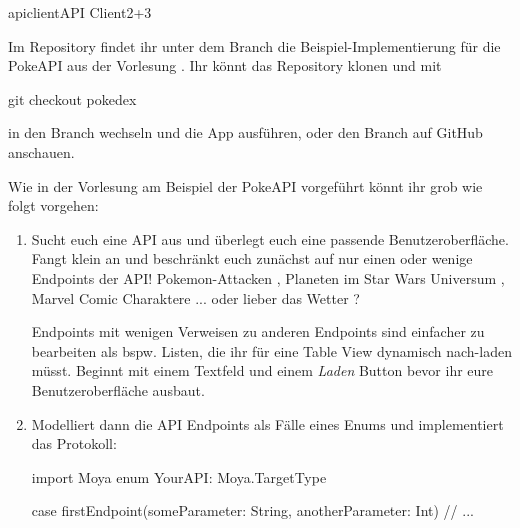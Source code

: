 \documentclass[parskip=half, final]{scrreprt}
\begin{document}
\begin{lecture}
\begin{exc}
\begin{excitem}{apiclient}{API Client}{2+3}

Im Repository findet ihr unter dem Branch  die Beispiel-Implementierung für die PokeAPI aus der Vorlesung . Ihr könnt das Repository klonen und mit
\begin{shcode}
git checkout pokedex
\end{shcode}
in den Branch wechseln und die App ausführen, oder den Branch auf GitHub  anschauen.


Wie in der Vorlesung am Beispiel der PokeAPI vorgeführt könnt ihr grob wie folgt vorgehen:
\begin{enumerate}[label=\arabic*.]
\item Sucht euch eine API aus und überlegt euch eine passende Benutzeroberfläche. Fangt klein an und beschränkt euch zunächst auf nur einen oder wenige Endpoints der API! Pokemon-Attacken , Planeten im Star Wars Universum , Marvel Comic Charaktere ... oder lieber das Wetter ?

Endpoints mit wenigen Verweisen zu anderen Endpoints sind einfacher zu bearbeiten als bspw. Listen, die ihr für eine Table View dynamisch nach-laden müsst. Beginnt mit einem Textfeld und einem \emph{Laden} Button bevor ihr eure Benutzeroberfläche ausbaut.
\item Modelliert dann die API Endpoints als Fälle eines Enums und implementiert das  Protokoll:
\begin{swiftcode}
import Moya
enum YourAPI: Moya.TargetType {
    case firstEndpoint(someParameter: String, anotherParameter: Int)
    // ...

}
\end{swiftcode}
\end{enumerate}
\end{excitem}
\end{exc}
\end{lecture}
\end{document}
